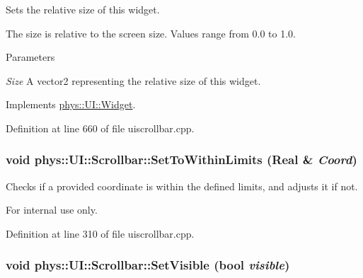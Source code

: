 Sets the relative size of this widget. 

The size is relative to the screen size. Values range from 0.0 to 1.0. 
\begin{DoxyParams}{Parameters}
\item[{\em Size}]A vector2 representing the relative size of this widget. \end{DoxyParams}


Implements \hyperlink{classphys_1_1UI_1_1Widget_a3fe0b767fea59e1d120ed37b26c99044}{phys::UI::Widget}.



Definition at line 660 of file uiscrollbar.cpp.

\hypertarget{classphys_1_1UI_1_1Scrollbar_a2048345c29ba15b8820971492f2bdea1}{
\subsubsection[{SetToWithinLimits}]{\setlength{\rightskip}{0pt plus 5cm}void phys::UI::Scrollbar::SetToWithinLimits ({\bf Real} \& {\em Coord})}}
\label{d0/d3e/classphys_1_1UI_1_1Scrollbar_a2048345c29ba15b8820971492f2bdea1}


Checks if a provided coordinate is within the defined limits, and adjusts it if not. 

\begin{DoxyInternal}{For internal use only.}
\end{DoxyInternal}


Definition at line 310 of file uiscrollbar.cpp.

\hypertarget{classphys_1_1UI_1_1Scrollbar_a2d8997e0bbbb1c17af5128fea98fb1e4}{
\subsubsection[{SetVisible}]{\setlength{\rightskip}{0pt plus 5cm}void phys::UI::Scrollbar::SetVisible (bool {\em visible})}}
\label{d0/d3e/classphys_1_1UI_1_1Scrollbar_a2d8997e0bbbb1c17af5128fea98fb1e4}


